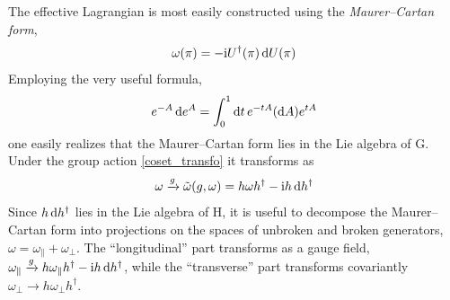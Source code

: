 \documentclass[final,3p,times,12pt,a4paper,sort&compress]{elsarticle}
\newcommand\gr[1]{\mathrm{#1}}              %
\newcommand\he[1]{#1^{\dagger}}             %
\newcommand\imag{\mathrm i}                 %
\newcommand\dd{\mathop{{\rm d}\!}\nolimits} %
\begin{document}
The effective Lagrangian is most easily constructed using the
\emph{Maurer--Cartan form},
\begin{equation}
\omega(\pi)=-\imag\he U(\pi)\dd U(\pi)
\end{equation}
Employing the very useful formula,
\begin{equation}
e^{-A}\dd e^A=\int_0^1\dd t\,e^{-tA}(\dd A)e^{tA}
\label{Baker_fla}
\end{equation}
one easily realizes that the Maurer--Cartan form lies in the Lie algebra of
$\gr G$. Under the group action \eqref{coset_transfo} it transforms as
\begin{equation}
\omega\xrightarrow{g}\tilde\omega(g,\omega)=h\omega\he h-\imag h\dd\he h
\label{Maurer_transfo}
\end{equation}
Since $h\dd\he h$ lies in the Lie algebra of $\gr H$, it is useful to decompose
the Maurer--Cartan form into projections on the spaces of unbroken and broken
generators, $\omega=\omega_\parallel+\omega_\perp$. The ``longitudinal'' part
transforms as a gauge field,
$\omega_\parallel\xrightarrow{g}h\omega_\parallel\he h-\imag h\dd\he h$, while
the ``transverse'' part transforms covariantly $\omega_\perp\to
h\omega_\perp\he h$.
\end{document}
